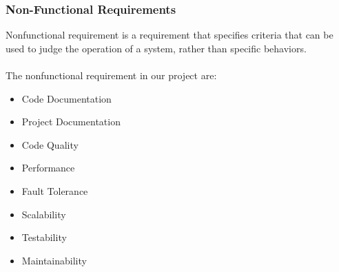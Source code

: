 \subsubsection{Non-Functional Requirements}
Non­functional requirement is a requirement that specifies criteria that can be used to judge the 
operation of a system, rather than specific behaviors.\\ 
\\
The non­functional requirement in our project are: 
\begin{itemize}
        \item Code Documentation
        \item Project Documentation
        \item Code Quality
        \item Performance
        \item Fault Tolerance
        \item Scalability
        \item Testability
        \item Maintainability
        \end{itemize}
                
